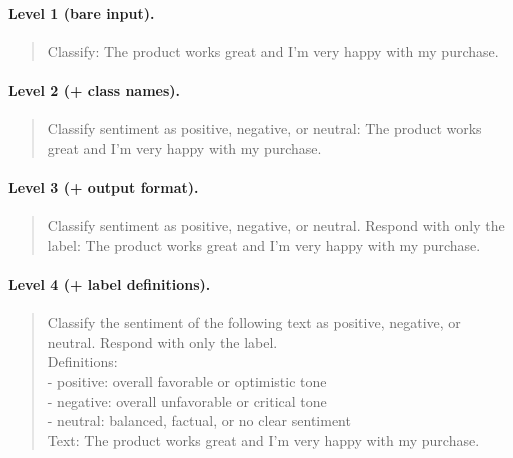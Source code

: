\paragraph{Level 1 (bare input).}
\begin{quote}\small\ttfamily
Classify: The product works great and I'm very happy with my purchase.
\end{quote}

\paragraph{Level 2 (+ class names).}
\begin{quote}\small\ttfamily
Classify sentiment as positive, negative, or neutral: The product works great
and I'm very happy with my purchase.
\end{quote}

\paragraph{Level 3 (+ output format).}
\begin{quote}\small\ttfamily
Classify sentiment as positive, negative, or neutral. Respond with only the
label: The product works great and I'm very happy with my purchase.
\end{quote}

\paragraph{Level 4 (+ label definitions).}
\begin{quote}\small\ttfamily
Classify the sentiment of the following text as positive, negative, or neutral.
Respond with only the label.\\[4pt]
Definitions:\\
- positive: overall favorable or optimistic tone\\
- negative: overall unfavorable or critical tone\\
- neutral: balanced, factual, or no clear sentiment\\[4pt]
Text: The product works great and I'm very happy with my purchase.
\end{quote}

